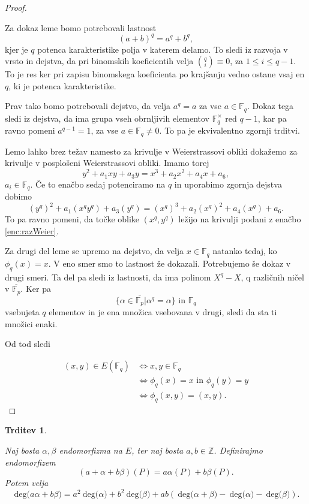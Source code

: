 \documentclass[12pt,a4paper,twoside]{article}
\theoremstyle{definition} %
\theoremstyle{plain} %
\newtheorem{trditev}[definicija]{Trditev}
\numberwithin{equation}{section}  %
\newcommand{\Z}{\mathbb Z}
\newcommand{\F}{\mathbb F}
\newcommand{\DEG}[1]{\ \text{deg(}{#1}\text{)}}
\begin{document}
\begin{proof}~

Za dokaz leme bomo potrebovali lastnost $$(a+b)^q = a^q+b^q,$$ kjer je $q$ potenca karakteristike polja v katerem delamo. To sledi iz razvoja v vrsto in dejstva, da pri binomskih koeficientih velja
${q\choose i} \equiv 0$, za $1 \leq i \leq q-1$. To je res ker pri zapisu binomskega koeficienta po krajšanju vedno ostane vsaj en $q$, ki je potenca karakteristike. 

Prav tako bomo potrebovali dejstvo, da velja $a^q = a$ za vse $a \in \F_q$. Dokaz tega sledi iz dejstva, da ima grupa vseh obrnljivih elementov $\F^{\times}_q$ red $q-1$, kar pa ravno pomeni $a^{q-1} = 1$, za vse $a \in \F_q \neq 0$. To pa je ekvivalentno zgornji trditvi.

Lemo lahko brez težav namesto za krivulje v Weierstrassovi obliki dokažemo za krivulje v posplošeni Weierstrassovi obliki.
Imamo torej
\begin{equation}
\label{enc:razWeier}
y^2+a_1xy+a_3y=x^3+a_2x^2+a_4x+a_6,
\end{equation}
$a_i \in \F_q$. Če to enačbo sedaj potenciramo na $q$ in uporabimo zgornja dejstva dobimo
$$(y^q)^2+a_1(x^qy^q)+a_3(y^q)=(x^q)^3+a_2(x^q)^2+a_4(x^q)+a_6.$$
To pa ravno pomeni, da točke oblike $(x^q,y^q)$ ležijo na krivulji podani z enačbo \ref{enc:razWeier}.

Za drugi del leme se upremo na dejstvo, da velja $x \in \F_q$ natanko tedaj, ko $\phi_q(x) = x$. V eno smer smo to lastnost že dokazali. Potrebujemo še dokaz v drugi smeri. Ta del pa sledi iz lastnosti, da ima polinom $X^q-X$, q različnih ničel v $\overline{\F_p}$. Ker pa
$$\{ \alpha \in \overline{\F_p} | \alpha^q = \alpha \} \text{ in } \F_q$$
vsebujeta $q$ elementov in je ena množica vsebovana v drugi, sledi da sta ti množici enaki.

Od tod sledi

\begin{align}
(x,y) \in E(\F_q) &{}\Leftrightarrow x,y \in \F_q \nonumber \\
&{}  \Leftrightarrow \phi_q(x) = x \text{ in } \phi_q(y) = y  \nonumber \\
&{} \Leftrightarrow \phi_q(x,y) = (x,y). \nonumber
\end{align} 

\end{proof}

\begin{trditev}~

\label{trd:3.16}
Naj bosta $\alpha,\beta$ endomorfizma na $E$, ter naj bosta $a,b \in \Z$. Definirajmo endomorfizem
$$(a+\alpha+b\beta)(P) = a\alpha(P)+b\beta(P).$$
Potem velja
$$\DEG{a\alpha+b\beta} = a^2\DEG{\alpha}+b^2\DEG{\beta} + ab(\DEG{\alpha+\beta}-\DEG{\alpha}-\DEG{\beta}).$$
\end{trditev}
\end{document}
